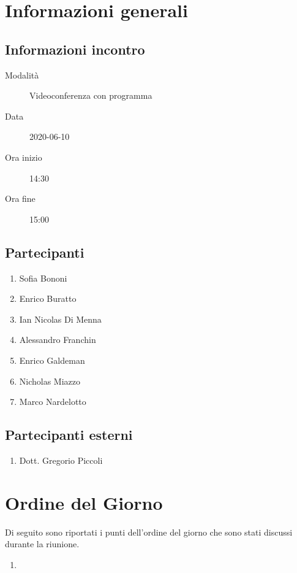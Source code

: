 \documentclass{article}
\begin{document}


\section{Informazioni generali}%
\label{sec:informazioni_generali}

\subsection{Informazioni incontro}%
\label{sub:informazioni_incontro}

\begin{description}
  \item[Modalità] Videoconferenza con programma 
  \item[Data] 2020-06-10
  \item[Ora inizio] 14:30
  \item[Ora fine] 15:00
\end{description}

\subsection{Partecipanti}%
\label{sub:partecipanti}

\begin{enumerate}
  \item Sofia Bononi
  \item Enrico Buratto
  \item Ian Nicolas Di Menna
  \item Alessandro Franchin
  \item Enrico Galdeman
  \item Nicholas Miazzo
  \item Marco Nardelotto
\end{enumerate}

\subsection{Partecipanti esterni}%
\label{sub:partecipanti esterni}

\begin{enumerate}
    \item Dott. Gregorio Piccoli
\end{enumerate}


\section{Ordine del Giorno}%
\label{ordine_del_giorno}
Di seguito sono riportati i punti dell'ordine del giorno che sono stati discussi durante la riunione.
\begin{enumerate}
  \item 
\end{enumerate}
\end{document}
